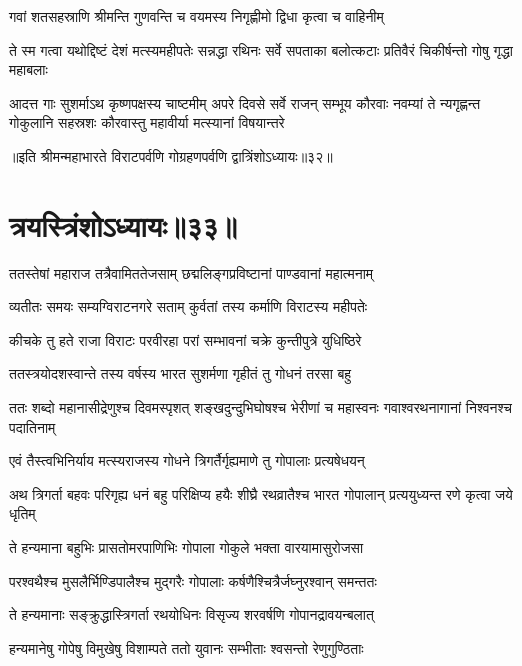 \twolineshloka
{गवां शतसहस्राणि श्रीमन्ति गुणवन्ति च}
{वयमस्य निगृह्णीमो द्विधा कृत्वा च वाहिनीम्}



\threelineshloka
{ते स्म गत्वा यथोद्दिष्टं देशं मत्स्यमहीपतेः}
{सन्नद्धा रथिनः सर्वे सपताका बलोत्कटाः}
{प्रतिवैरं चिकीर्षन्तो गोषु गृद्धा महाबलाः}


\onelineshloka
{आदत्त गाः सुशर्माऽथ कृष्णपक्षस्य चाष्टमीम्}
\threelineshloka
{अपरे दिवसे सर्वे राजन् सम्भूय कौरवाः}
{नवम्यां ते न्यगृह्णन्त गोकुलानि सहस्रशः}
{कौरवास्तु महावीर्या मत्स्यानां विषयान्तरे}

॥इति श्रीमन्महाभारते विराटपर्वणि गोग्रहणपर्वणि द्वात्रिंशोऽध्यायः॥३२॥

\chapter{त्रयस्त्रिंशोऽध्यायः॥३३॥}

\twolineshloka
{ततस्तेषां महाराज तत्रैवामिततेजसाम्}
{छद्मलिङ्गप्रविष्टानां पाण्डवानां महात्मनाम्}


\twolineshloka
{व्यतीतः समयः सम्यग्विराटनगरे सताम्}
{कुर्वतां तस्य कर्माणि विराटस्य महीपतेः}


\twolineshloka
{कीचके तु हते राजा विराटः परवीरहा}
{परां सम्भावनां चक्रे कुन्तीपुत्रे युधिष्ठिरे}


\twolineshloka
{ततस्त्रयोदशस्वान्ते तस्य वर्षस्य भारत}
{सुशर्मणा गृहीतं तु गोधनं तरसा बहु}


\threelineshloka
{ततः शब्दो महानासीद्रेणुश्च दिवमस्पृशत्}
{शङ्खदुन्दुभिघोषश्च भेरीणां च महास्वनः}
{गवाश्वरथनागानां निश्वनश्च पदातिनाम्}


\twolineshloka
{एवं तैस्त्वभिनिर्याय मत्स्यराजस्य गोधने}
{त्रिगर्तैर्गृह्यमाणे तु गोपालाः प्रत्यषेधयन्}


\threelineshloka
{अथ त्रिगर्ता बहवः परिगृह्य धनं बहु}
{परिक्षिप्य हयैः शीघ्रै रथव्रातैश्च भारत}
{गोपालान् प्रत्ययुध्यन्त रणे कृत्वा जये धृतिम्}


\twolineshloka
{ते हन्यमाना बहुभिः प्रासतोमरपाणिभिः}
{गोपाला गोकुले भक्ता वारयामासुरोजसा}


\twolineshloka
{परश्वथैश्च मुसलैर्भिण्डिपालैश्च मुद्गरैः}
{गोपालाः कर्षणैश्चित्रैर्जघ्नुरश्वान् समन्ततः}


\twolineshloka
{ते हन्यमानाः सङ्क्रुद्धास्त्रिगर्ता रथयोधिनः}
{विसृज्य शरवर्षणि गोपानद्रावयन्बलात्}


\twolineshloka
{हन्यमानेषु गोपेषु विमुखेषु विशाम्पते}
{ततो युवानः सम्भीताः श्वसन्तो रेणुगुण्ठिताः}


